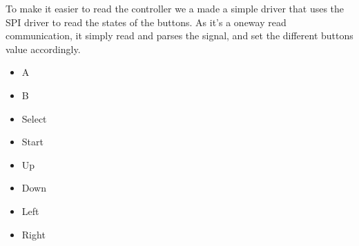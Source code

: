 To make it easier to read the controller we a made a simple driver that uses the SPI driver to read the states of the buttons. As it's a oneway read communication, it simply read and parses the signal, and set the different buttons value accordingly.

\begin{itemize}
\item A
\item B
\item Select
\item Start
\item Up
\item Down
\item Left
\item Right
\end{itemize}

